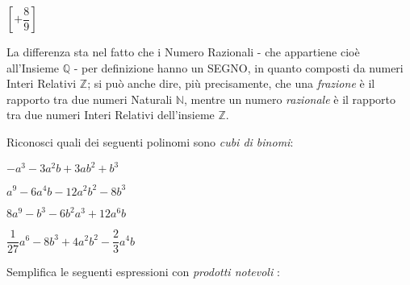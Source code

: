 \documentclass[11pt, a4paper, landscape]{exam}
\newcommand{\numberset}{\mathbb}
\newcommand{\N}{\numberset{N}}
\newcommand{\Z}{\numberset{Z}}
\newcommand{\Q}{\numberset{Q}}
\begin{document}
\begin{questions}
\begin{multicols}{2}
\begin{parts}

\begin{solution}
\( \left[ + \dfrac{8}{9} \right] \)
\end{solution}
\end{parts}


\begin{solution}
La differenza sta nel fatto che i Numero Razionali - che appartiene cioè all'Insieme \( \Q \)	- per definizione hanno un SEGNO, in quanto composti da numeri Interi Relativi \( \Z \); si può anche dire, più precisamente, che una \emph{frazione} è il rapporto tra due numeri Naturali \( \N \), mentre un numero \emph{razionale} è il rapporto tra due numeri Interi Relativi dell'insieme \( \Z \).
\end{solution}

\vspace{.3cm}


\question Riconosci quali dei seguenti polinomi sono \emph{cubi di binomi}:\\

\begin{choices}
\CorrectChoice
\quad \( -a^3 - 3 a^2b + 3ab^2 + b^3\)

\vspace{0.2\baselineskip}

\choice
\quad \( a^9 - 6a^4b - 12a^2b^2 - 8b^3 \)
\vspace{0.2\baselineskip}

\choice
\quad \( 8a^9 - b^3 - 6b^2a^3 + 12a^6b \)
\vspace{0.2\baselineskip}

\CorrectChoice
\quad \( \dfrac{1}{27} a^6 - 8b^3 + 4a^2b^2 - \dfrac{2}{3} a^4b \)

\end{choices}

\vspace{.3cm}

\question Semplifica le seguenti espressioni con \emph{prodotti notevoli} :
\begin{parts}
\vspace{.3cm}

\part


\end{parts}
\end{multicols}
\end{questions}
\end{document}
